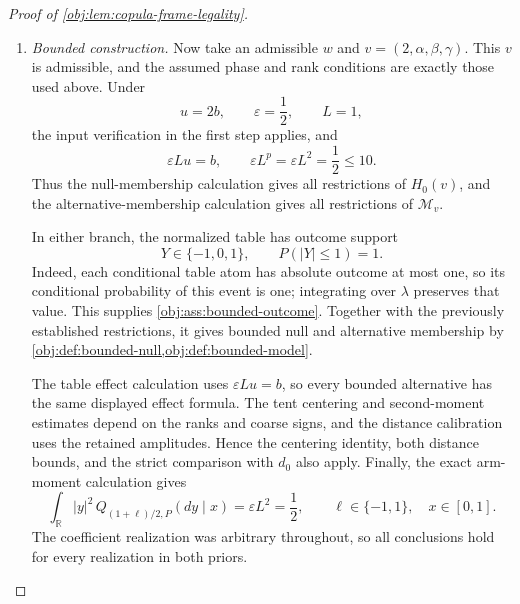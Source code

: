 \begin{proof}[Proof of \cref{obj:lem:copula-frame-legality}]
\begin{enumerate}
\item \textit{Bounded construction.}
Now take an admissible \(w\) and \(v=(2,\alpha,\beta,\gamma)\). This \(v\) is admissible, and the assumed phase and rank conditions are exactly those used above. Under
\[
u=2b,\qquad \varepsilon=\frac12,\qquad L=1,
\]
the input verification in the first step applies, and
\[
\varepsilon Lu=b,\qquad
\varepsilon L^p=\varepsilon L^2=\frac12\le10.
\]
Thus the null-membership calculation gives all restrictions of
\(H_0(v)\), and the alternative-membership calculation gives all restrictions of \(\mathcal M_v\).

In either branch, the normalized table has outcome support
\[
Y\in\{-1,0,1\},
\qquad P(|Y|\le1)=1.
\]
Indeed, each conditional table atom has absolute outcome at most one, so its conditional probability of this event is one; integrating over \(\lambda\) preserves that value. This supplies
\cref{obj:ass:bounded-outcome}. Together with the previously established restrictions, it gives bounded null and alternative membership by
\cref{obj:def:bounded-null,obj:def:bounded-model}.

The table effect calculation uses \(\varepsilon Lu=b\), so every bounded alternative has the same displayed effect formula. The tent centering and second-moment estimates depend on the ranks and coarse signs, and the distance calibration uses the retained amplitudes. Hence the centering identity, both distance bounds, and the strict comparison with \(d_0\) also apply. Finally, the exact arm-moment calculation gives
\[
\int_{\mathbb R}|y|^2
\,Q_{(1+\ell)/2,P}(dy\mid x)
=\varepsilon L^2=\frac12,
\qquad \ell\in\{-1,1\},\quad x\in[0,1].
\]
The coefficient realization was arbitrary throughout, so all conclusions hold for every realization in both priors.
\end{enumerate}
\end{proof}
